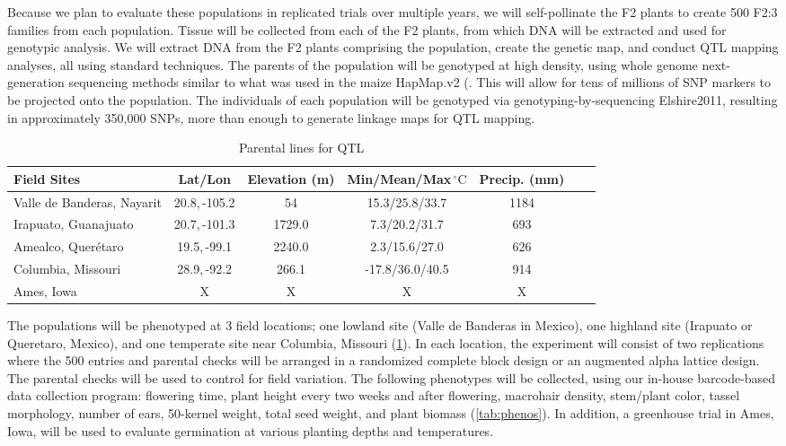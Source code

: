 Because we plan to evaluate these populations in replicated trials over multiple years, we will self-pollinate the F2 plants to create 500 F2:3 families from each population.  Tissue will be collected from each of the F2 plants, from which DNA will be extracted and used for genotypic analysis.  We will extract DNA from the F2 plants comprising the population, create the genetic map, and conduct QTL mapping analyses, all using standard techniques.  The parents of the population will be genotyped at high density, using whole genome next-generation sequencing methods similar to what was used in the maize HapMap.v2 (\cite{Chia2012a}.  This will allow for tens of millions of SNP markers to be projected onto the population.  The individuals of each population will be genotyped via genotyping-by-sequencing \cite{GBS}{Elshire2011}, resulting in approximately 350,000 SNPs, more than enough to generate linkage maps for QTL mapping.

\begin{table}
\begin{center}
\caption{Parental lines for QTL} \label{tab:locales}
\begin{tabular}{p{3cm}cccccc}\\\toprule  
{\bf Field Sites} & {\bf Lat/Lon } & {\bf Elevation (m) } &	{\bf Min/Mean/Max\,$^{\circ} \mathrm{C}$  } & {\bf Precip. (mm) } \\ \toprule
Valle de Banderas, Nayarit	& 20.8,\,-105.2&	54		&	15.3/25.8/33.7	&	1184 \\
Irapuato, Guanajuato 	&	20.7,\,-101.3	&	1729.0	&	7.3/20.2/31.7	&	693 \\
Amealco, Quer\'etaro 	&	19.5,\,-99.1	&	2240.0 	&	2.3/15.6/27.0	&	626\\
Columbia, Missouri		& 	28.9,\,-92.2	&	266.1 	&	-17.8/36.0/40.5&	914\\
Ames, Iowa	& 	X	&	X 	&	X		&	X	 \\ \bottomrule
\end{tabular}
\end{center}
\end{table} 

The populations will be phenotyped at 3 field locations; one lowland site (Valle de Banderas in Mexico), one highland site (Irapuato or Queretaro, Mexico), and one temperate site near Columbia, Missouri (\ref{tab:locales}).  In each location, the experiment will consist of two replications where the 500 entries and parental checks will be arranged in a randomized complete block design or an augmented alpha lattice design. The parental checks will be used to control for field variation.  The following phenotypes will be collected, using our in-house barcode-based data collection program:  flowering time, plant height every two weeks and after flowering, macrohair density, stem/plant color, tassel morphology, number of ears, 50-kernel weight, total seed weight, and plant biomass (\ref{tab:phenos}).  In addition, a greenhouse trial in Ames, Iowa, will be used to evaluate germination at various planting depths and temperatures.  %


